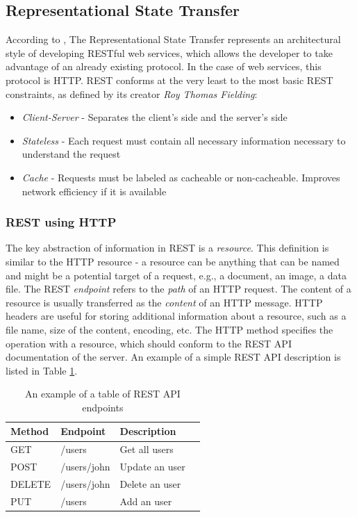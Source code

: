 \subsection{Representational State Transfer}
According to \cite{RestAPI}, The Representational State Transfer represents an architectural style of developing RESTful web services, which allows the developer to take advantage of an already existing protocol. In the case of web services, this protocol is HTTP. REST conforms at the very least to the most basic REST constraints, as defined by its creator \textit{Roy Thomas Fielding}:

\begin{itemize}
    \item \textit{Client-Server} - Separates the client's side and the server's side
    \item \textit{Stateless} - Each request must contain all necessary information necessary to understand the request
    \item \textit{Cache} - Requests must be labeled as cacheable or non-cacheable. Improves network efficiency if it is available
\end{itemize}
\subsubsection{REST using HTTP}
The key abstraction of information in REST is a \textit{resource}. This definition is similar to the HTTP resource -  a resource can be anything that can be named and might be a potential target of a request, e.g., a document, an image, a data file. The REST \textit{endpoint} refers to the \textit{path} of an HTTP request. The content of a resource is usually transferred as the \textit{content} of an HTTP message. HTTP headers are useful for storing additional information about a resource, such as a file name, size of the content, encoding, etc. The HTTP method specifies the operation with a resource, which should conform to the REST API documentation of the server. An example of a simple REST API description is listed in Table \ref{restapiex}.
\begin{table}[hbt]
\centering
\label{restapiex}
\begin{tabular}{|l|l|l|l|}
\hline
\textbf{Method} & \textbf{Endpoint} & \textbf{Description} \\ \hline
 GET & /users & Get all users \\ \hline
 POST & /users/john & Update an user  \\ \hline
 DELETE & /users/john &  Delete an user \\ \hline
 PUT & /users & Add an user \\ \hline
\end{tabular}
\caption{An example of a table of REST API endpoints }
\end{table} 

